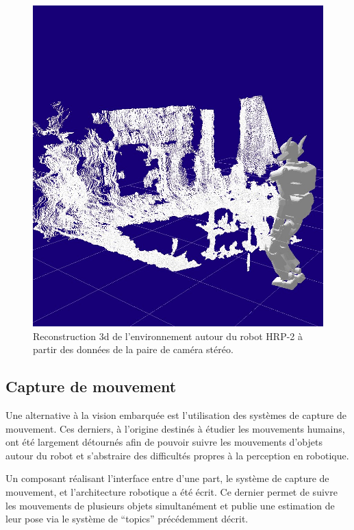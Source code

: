\begin{figure}
  \begin{center}
    \includegraphics[width=.95\linewidth]{src/chap4-integration/stereo1.jpg}
  \end{center}
  \caption{Reconstruction 3d de l'environnement autour du robot HRP-2
    à partir des données de la paire de caméra stéréo.}
\end{figure}


\subsection{Capture de mouvement}

Une alternative à la vision embarquée est l'utilisation des systèmes
de capture de mouvement. Ces derniers, à l'origine destinés à étudier
les mouvements humains, ont été largement détournés afin de pouvoir
suivre les mouvements d'objets autour du robot et s'abstraire des
difficultés propres à la perception en robotique.


Un composant réalisant l'interface entre d'une part, le système de
capture de mouvement, et l'architecture robotique a été écrit. Ce
dernier permet de suivre les mouvements de plusieurs objets
simultanément et publie une estimation de leur pose via le système de
``topics'' précédemment décrit.


